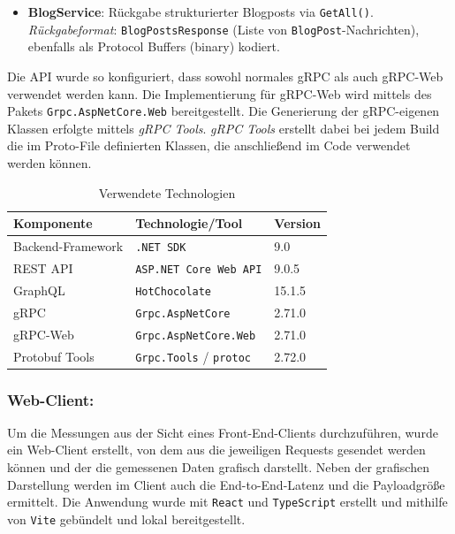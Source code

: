 \begin{enumerate}
\begin{itemize}
	\item \textbf{BlogService}: Rückgabe strukturierter Blogposts via \texttt{GetAll()}.\\
	\emph{Rückgabeformat}: \texttt{BlogPostsResponse} (Liste von \texttt{BlogPost}-Nachrichten), ebenfalls als Protocol Buffers (binary) kodiert.
\end{itemize}

Die API wurde so konfiguriert, dass sowohl normales gRPC als auch gRPC-Web verwendet werden kann. Die Implementierung für gRPC-Web wird mittels des Pakets \texttt{Grpc.AspNetCore.Web} bereitgestellt. Die Generierung der gRPC-eigenen Klassen erfolgte mittels \emph{gRPC Tools}. \emph{gRPC Tools} erstellt dabei bei jedem Build die im Proto-File definierten Klassen, die anschließend im Code verwendet werden können.

\begin{table}[h]
	\centering
	\caption{Verwendete Technologien}
	\begin{tabular}{lll}
		\hline
		\textbf{Komponente} & \textbf{Technologie/Tool} & \textbf{Version} \\
		\hline
		Backend-Framework & \texttt{.NET~SDK} & 9.0 \\
		REST API & \texttt{ASP.NET~Core~Web~API} & 9.0.5 \\
		GraphQL & \texttt{HotChocolate} & 15.1.5 \\
		gRPC & \texttt{Grpc.AspNetCore} & 2.71.0 \\
		gRPC-Web & \texttt{Grpc.AspNetCore.Web} & 2.71.0 \\
		Protobuf Tools & \texttt{Grpc.Tools} / \texttt{protoc} & 2.72.0 \\
		\hline
	\end{tabular}
\end{table}

\subsubsection{Web-Client:}
Um die Messungen aus der Sicht eines Front-End-Clients durchzuführen, wurde ein Web-Client erstellt, von dem aus die jeweiligen Requests gesendet werden können und der die gemessenen Daten grafisch darstellt. Neben der grafischen Darstellung werden im Client auch die End-to-End-Latenz und die Payloadgröße ermittelt. Die Anwendung wurde mit \texttt{React} und \texttt{TypeScript} erstellt und mithilfe von \texttt{Vite} gebündelt und lokal bereitgestellt.


\end{enumerate}
